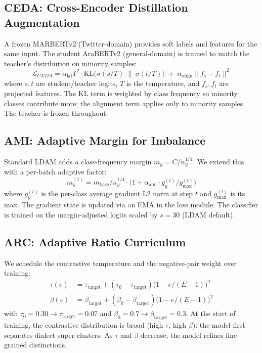 \documentclass[11pt,a4paper,twocolumn]{article}
\newcommand{\ceda}{CEDA}
\newcommand{\ami}{AMI}
\newcommand{\arc}{ARC}
\begin{document}
\subsection{\ceda{}: Cross-Encoder Distillation Augmentation}
A frozen MARBERTv2 (Twitter-domain) provides soft labels and
features for the same input. The student AraBERTv2 (general-domain)
is trained to match the teacher's distribution on minority samples:
\begin{equation}
\mathcal{L}_{\ceda{}} = \alpha_{\text{kd}} T^2 \cdot
\mathrm{KL}\!\bigl(\sigma(s/T)\;\|\;\sigma(t/T)\bigr)
\;+\; \alpha_{\text{align}}\|f_s - f_t\|^2
\label{eq:ceda}
\end{equation}
where $s,t$ are student/teacher logits, $T$ is the temperature, and
$f_s,f_t$ are projected features. The KL term is weighted by class
frequency so minority classes contribute more; the alignment term
applies only to minority samples. The teacher is frozen throughout.

\subsection{\ami{}: Adaptive Margin for Imbalance}
Standard LDAM \citep{Cao2019ldam} adds a class-frequency margin
$m_y = C/n_y^{1/4}$. We extend this with a per-batch adaptive factor:
\begin{equation}
m_y^{(t)} = m_{\text{base}}/n_y^{1/4} \cdot \bigl(1 + \alpha_{\text{ami}} \cdot g_y^{(t)} / g_{\max}^{(t)}\bigr)
\label{eq:ami}
\end{equation}
where $g_y^{(t)}$ is the per-class average gradient L2 norm at
step $t$ and $g_{\max}^{(t)}$ is its max. The gradient state is
updated via an EMA in the loss module. The classifier is trained
on the margin-adjusted logits scaled by $s{=}30$ (LDAM default).

\subsection{\arc{}: Adaptive Ratio Curriculum}
We schedule the contrastive temperature and the negative-pair weight
over training:
\begin{align}
\tau(e) &= \tau_{\text{target}} + (\tau_0 - \tau_{\text{target}})\bigl(1 - e/(E{-}1)\bigr)^2 \\
\beta(e) &= \beta_{\text{target}} + (\beta_0 - \beta_{\text{target}})\bigl(1 - e/(E{-}1)\bigr)^2
\label{eq:arc}
\end{align}
with $\tau_0{=}0.30\!\to\!\tau_{\text{target}}{=}0.07$ and
$\beta_0{=}0.7\!\to\!\beta_{\text{target}}{=}0.3$. At the start of
training, the contrastive distribution is broad (high $\tau$, high
$\beta$): the model first separates dialect super-clusters. As
$\tau$ and $\beta$ decrease, the model refines fine-grained
distinctions.
\end{document}
